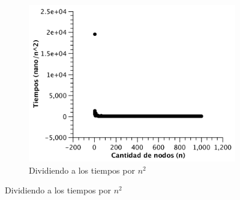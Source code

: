 \begin{figure}[H]
        \centering
        \begin{subfigure}[b]{0.45\textwidth}
                \includegraphics[width=\textwidth]{imagenes/vacio-matriz-3.pdf}
                \caption{Dividiendo a los tiempos por $n^2$}
        \end{subfigure}
		

\end{figure}
